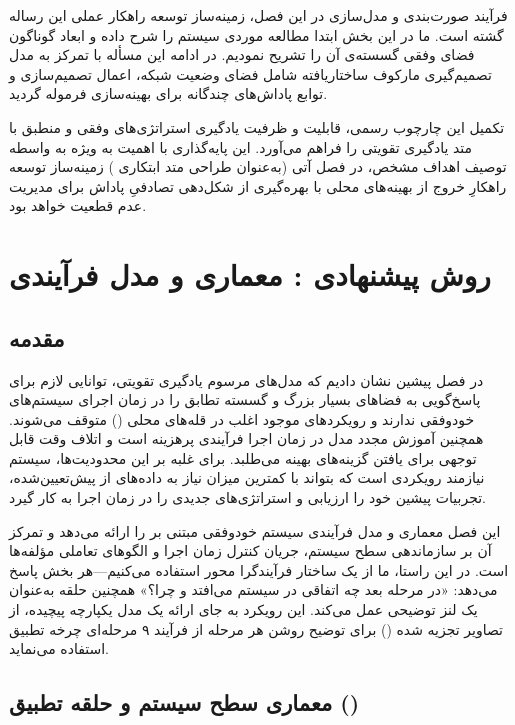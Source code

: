\documentclass[oneside,openany,phd]{TMU-Thesis}
\begin{document}
فرآیند صورت‌بندی و مدل‌سازی در این فصل، زمینه‌ساز توسعه راهکار عملی این رساله گشته است. ما در این بخش ابتدا مطالعه موردی سیستم  را شرح داده و ابعاد گوناگون فضای وفقی گسسته‌ی آن را تشریح نمودیم. در ادامه این مسأله با تمرکز به مدل تصمیم‌گیری مارکوف ساختاریافته شامل فضای وضعیت شبکه، اعمال تصمیم‌سازی و توابع پاداش‌های چندگانه برای بهینه‌سازی فرموله گردید.

تکمیل این چارچوب رسمی، قابلیت و ظرفیت یادگیری استراتژی‌های وفقی و منطبق با متد یادگیری تقویتی را فراهم می‌آورد. این پایه‌گذاری با اهمیت به ویژه به واسطه توصیف اهداف مشخص، در فصل آتی (به‌عنوان طراحی متد ابتکاری ) زمینه‌ساز توسعه راهکارِ خروج از بهینه‌های محلی با بهره‌گیری از شکل‌دهی تصادفیِ پاداش برای مدیریت عدم قطعیت خواهد بود.

\newpage

\chapter{روش پیشنهادی : معماری و مدل فرآیندی}
\section{مقدمه}

در فصل پیشین نشان دادیم که مدل‌های مرسوم یادگیری تقویتی، توانایی لازم برای پاسخ‌گویی به فضاهای بسیار بزرگ و گسسته تطابق را در زمان اجرای سیستم‌های خودوفقی ندارند و رویکردهای موجود اغلب در قله‌های محلی () متوقف می‌شوند. همچنین آموزش مجدد مدل در زمان اجرا فرآیندی پرهزینه است و اتلاف وقت قابل توجهی برای یافتن گزینه‌های بهینه می‌طلبد. برای غلبه بر این محدودیت‌ها، سیستم نیازمند رویکردی است که بتواند با کمترین میزان نیاز به داده‌های از پیش‌تعیین‌شده، تجربیات پیشین خود را ارزیابی و استراتژی‌های جدیدی را در زمان اجرا به کار گیرد.

این فصل معماری و مدل فرآیندی سیستم خودوفقی مبتنی بر  را ارائه می‌دهد و تمرکز آن بر سازماندهی سطح سیستم، جریان کنترل زمان اجرا و الگوهای تعاملی مؤلفه‌ها است. در این راستا، ما از یک ساختار فرآیندگرا محور استفاده می‌کنیم—هر بخش پاسخ می‌دهد: «در مرحله بعد چه اتفاقی در سیستم می‌افتد و چرا؟» همچنین حلقه  به‌عنوان یک لنز توضیحی عمل می‌کند. این رویکرد به جای ارائه یک مدل یکپارچه پیچیده، از تصاویر تجزیه شده () برای توضیح روشن هر مرحله از فرآیند ۹ مرحله‌ای چرخه تطبیق استفاده می‌نماید.

\section{معماری سطح سیستم و حلقه تطبیق ()}
\end{document}
